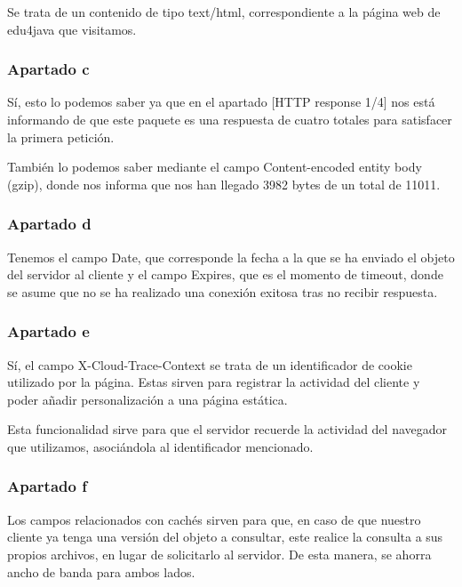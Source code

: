 \documentclass[spanish]{report} %
\begin{document}
Se trata de un contenido de tipo text/html, correspondiente a la página web de
edu4java que visitamos.

\subsubsection{Apartado c}

Sí, esto lo podemos saber ya que en el apartado [HTTP response 1/4] nos está
informando de que este paquete es una respuesta de cuatro totales para
satisfacer la primera petición.\newline

También lo podemos saber mediante el campo Content-encoded entity body (gzip),
donde nos informa que nos han llegado 3982 bytes de un total de 11011.

\subsubsection{Apartado d}

Tenemos el campo Date, que corresponde la fecha a la que se ha enviado el objeto
del servidor al cliente y el campo Expires, que es el momento de timeout, donde
se asume que no se ha realizado una conexión exitosa tras no recibir respuesta.

\subsubsection{Apartado e}

Sí, el campo X-Cloud-Trace-Context se trata de un identificador de cookie
utilizado por la página. Estas sirven para registrar la actividad del cliente y
poder añadir personalización a una página estática.\newline

Esta funcionalidad sirve para que el servidor recuerde la actividad del
navegador que utilizamos, asociándola al identificador mencionado.

\subsubsection{Apartado f}

Los campos relacionados con cachés sirven para que, en caso de que nuestro
cliente ya tenga una versión del objeto a consultar, este realice la consulta a
sus propios archivos, en lugar de solicitarlo al servidor. De esta manera, se
ahorra ancho de banda para ambos lados.

\newpage
\end{document}
